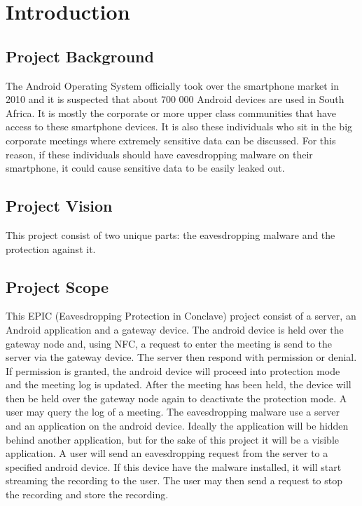 \documentclass{article}
\begin{document}
	
	
	\newpage
	\tableofcontents
	\newpage
	\section{Introduction}
		\subsection{Project Background}

The Android Operating System officially took over the smartphone market in 2010 and it is suspected that about 700 000 Android devices are used in South Africa. It is mostly the corporate or more upper class communities that have access to these smartphone devices. It is also these individuals who sit in the big corporate meetings where extremely sensitive data can be discussed. For this reason, if these individuals should have eavesdropping malware on their smartphone, it could cause sensitive data to be easily leaked out.


		\subsection{Project Vision}
This project consist of two unique parts: the eavesdropping malware and the protection against it.
		\subsection{Project Scope}
This EPIC (Eavesdropping Protection in Conclave) project consist of a server, an Android application and a gateway device. The android device is held over the gateway node and, using NFC, a request to enter the meeting is send to the server via the gateway device. The server then respond with permission or denial. If permission is granted, the android device will proceed into protection mode and the meeting log is updated. After the meeting has been held, the device will then be held over the gateway node again to deactivate the protection mode. A user may query the log of a meeting.
\newline
The eavesdropping malware use a server and an application on the android device. Ideally the application will be hidden behind another application, but for the sake of this project it will be a visible application. A user will send an eavesdropping request from the server to a specified android device. If this device have the malware installed, it will start streaming the recording to the user. The user may then send a request to stop the recording and store the recording.
\end{document}
